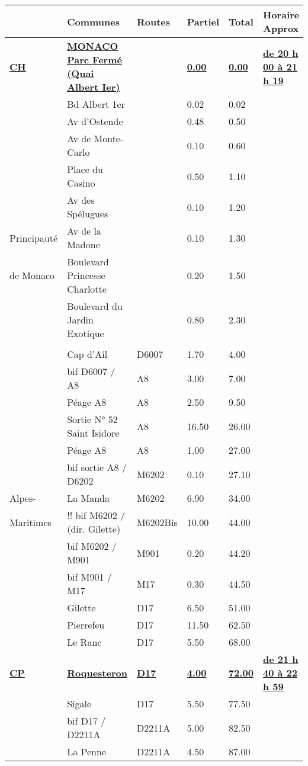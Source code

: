 \documentclass{article}%
\begin{document}
\begin{longtable}{p{2.25cm}|p{6.7cm}|p{2.0cm}|p{1.5cm}|p{1.5cm}|p{3.5cm}}%
\hline%
&Communes&Routes&Partiel&Total&Horaire Approx\\%
\hline%
\endhead%
\endfoot%
\endlastfoot%
\textbf{\underline{﻿CH}}&\textbf{\underline{MONACO Parc Fermé (Quai Albert Ier)}}& &\textbf{\underline{0.00}}&\textbf{\underline{0.00}}&\textbf{\underline{de 20 h 00 à 21 h 19}}\\%
 &Bd Albert 1er& &0.02&0.02& \\%
 &Av d'Ostende& &0.48&0.50& \\%
 &Av de Monte-Carlo& &0.10&0.60& \\%
 &Place du Casino& &0.50&1.10& \\%
 &Av des Spélugues& &0.10&1.20& \\%
Principauté&Av de la Madone& &0.10&1.30& \\%
de Monaco&Boulevard Princesse Charlotte& &0.20&1.50& \\%
 &Boulevard du Jardin Exotique& &0.80&2.30& \\%
\hline& & & & & \\%
 &Cap d'Ail&D6007&1.70&4.00& \\%
 &bif D6007 / A8&A8&3.00&7.00& \\%
 &Péage A8&A8&2.50&9.50& \\%
 &Sortie N° 52 Saint Isidore&A8&16.50&26.00& \\%
 &Péage A8&A8&1.00&27.00& \\%
 &bif sortie A8 / D6202&M6202&0.10&27.10& \\%
Alpes-&La Manda&M6202&6.90&34.00& \\%
Maritimes&!! bif M6202 / (dir. Gilette)&M6202Bis&10.00&44.00& \\%
 &bif M6202 / M901&M901&0.20&44.20& \\%
 &bif M901 / M17&M17&0.30&44.50& \\%
 &Gilette&D17&6.50&51.00& \\%
 &Pierrefeu&D17&11.50&62.50& \\%
 &Le Ranc&D17&5.50&68.00& \\%
\textbf{\underline{CP}}&\textbf{\underline{Roquesteron}}&\textbf{\underline{D17}}&\textbf{\underline{4.00}}&\textbf{\underline{72.00}}&\textbf{\underline{de 21 h 40 à 22 h 59}}\\%
 &Sigale&D17&5.50&77.50& \\%
 &bif D17 / D2211A&D2211A&5.00&82.50& \\%
 &La Penne&D2211A&4.50&87.00& \\%

\end{longtable}
\end{document}
